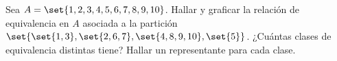 \ejercicio
\Hacer
Sea $A = \set{1,2,3,4,5,6,7,8,9,10}$. Hallar y graficar la relación de equivalencia en $A$ asociada a la partición $\set{ \set{1,3}, \set{2,6,7}, \set{4,8,9,10}, \set{5} }$.
¿Cuántas clases de equivalencia distintas tiene? Hallar un representante para cada clase.

